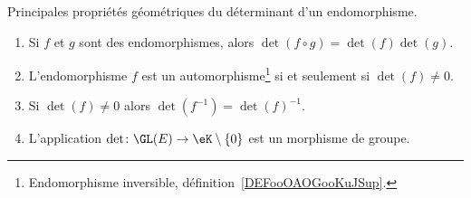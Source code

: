 \begin{proposition}     \label{PropYQNMooZjlYlA}
	Principales propriétés géométriques du déterminant d'un endomorphisme.
	\begin{enumerate}
		\item   \label{ItemUPLNooYZMRJy}
		      Si \( f\) et \( g\)  sont des endomorphismes, alors \( \det(f\circ g)=\det(f)\det(g)\).
		\item       \label{ITEMooNZNLooODdXeH}
		      L'endomorphisme \( f\) est un automorphisme\footnote{Endomorphisme inversible, définition~\ref{DEFooOAOGooKuJSup}.} si et seulement si \( \det(f)\neq 0\).
		\item   \label{ITEMooZMVXooLGjvCy}
		      Si \( \det(f)\neq 0\) alors \( \det(f^{-1})=\det(f)^{-1}\).
		\item       \label{ItemooPJVYooYSwqaE}
		      L'application \( \det\colon \GL(E)\to \eK\setminus\{ 0 \}\) est un morphisme de groupe.
	\end{enumerate}
\end{proposition}

